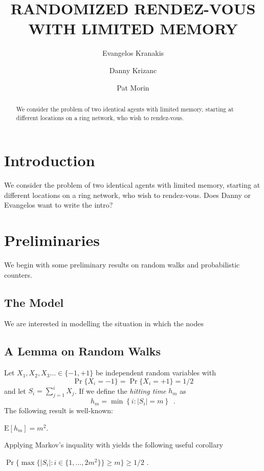 \documentclass[lotsofwhite]{patmorin}
\title{\MakeUppercase{Randomized Rendez-Vous with Limited Memory}}
\author{Evangelos Kranakis \and
	Danny Krizanc \and
	Pat Morin}
\newcommand{\E}{\mathrm{E}}
\begin{document}
\maketitle
\begin{abstract}
We consider the problem of two identical agents with limited memory, 
starting at different locations on a ring network, who wish to 
rendez-vous.
\end{abstract}

\section{Introduction}

We consider the problem of two identical agents with limited memory,
starting at different locations on a ring network, who wish to
rendez-vous.  Does Danny or Evangelos want to write the intro?



\section{Preliminaries}

We begin with some preliminary results on random walks and probabilistic
counters.

\subsection{The Model}

We are interested in modelling the situation in which the nodes
\subsection{A Lemma on Random Walks}

Let $X_1,X_2,X_3\ldots\in\{-1,+1\}$ be independent random variables with
\[ \Pr\{X_i=-1\}=\Pr\{X_i=+1\}=1/2
\]
and let $S_i=\sum_{j=1}^i X_j$.
If we define the \emph{hitting time} $h_m$ as
\[
   h_m = \min\left\{i:|S_i|= m\right\} \enspace .
\]
The following result is well-known:
\begin{lem}[\cite{X,Y}]
$\E[h_m] = m^2$.
\end{lem}
Applying Markov's inquality with  yields the
following useful corollary
\begin{cor}
$\Pr\{\max\{|S_i|:i\in\{1,\ldots,2m^2\}\} \ge m\} \ge 1/2$ .
\end{cor}
\end{document}

